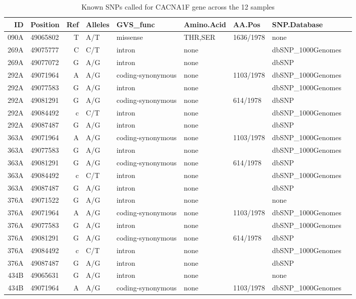 \documentclass{article}
\begin{document}
\begin{table}[tbp]
\centering
\caption{Known SNPs called for CACNA1F gene across the 12 samples} 
\label{tab:SNPa1F}
{\small
\begin{tabular}{rlrllllll}
  \hline
 ID & Position & Ref & Alleles & GVS\_func & Amino.Acid & AA.Pos & SNP.Database \\ 
  \hline
090A & 49065802 & T & A/T & missense & THR,SER & 1636/1978 & none \\ 
269A & 49075777 & C & C/T & intron & none &  & dbSNP\_1000Genomes \\ 
269A & 49077072 & G & A/G & intron & none &  & dbSNP \\ 
292A & 49071964 & A & A/G & coding-synonymous & none & 1103/1978 & dbSNP\_1000Genomes \\ 
292A & 49077583 & G & A/G & intron & none &  & dbSNP\_1000Genomes \\ 
292A & 49081291 & G & A/G & coding-synonymous & none & 614/1978 & dbSNP \\ 
292A & 49084492 & c & C/T & intron & none &  & dbSNP\_1000Genomes \\ 
292A & 49087487 & G & A/G & intron & none &  & dbSNP \\ 
363A & 49071964 & A & A/G & coding-synonymous & none & 1103/1978 & dbSNP\_1000Genomes \\ 
363A & 49077583 & G & A/G & intron & none &  & dbSNP\_1000Genomes \\ 
363A & 49081291 & G & A/G & coding-synonymous & none & 614/1978 & dbSNP \\ 
363A & 49084492 & c & C/T & intron & none &  & dbSNP\_1000Genomes \\ 
363A & 49087487 & G & A/G & intron & none &  & dbSNP \\ 
376A & 49071522 & G & A/G & intron & none &  & none \\ 
376A & 49071964 & A & A/G & coding-synonymous & none & 1103/1978 & dbSNP\_1000Genomes \\ 
376A & 49077583 & G & A/G & intron & none &  & dbSNP\_1000Genomes \\ 
376A & 49081291 & G & A/G & coding-synonymous & none & 614/1978 & dbSNP \\ 
376A & 49084492 & c & C/T & intron & none &  & dbSNP\_1000Genomes \\ 
376A & 49087487 & G & A/G & intron & none &  & dbSNP \\ 
434B & 49065631 & G & A/G & intron & none &  & none \\ 
434B & 49071964 & A & A/G & coding-synonymous & none & 1103/1978 & dbSNP\_1000Genomes \\ 

\end{tabular}}
\end{table}
\end{document}
